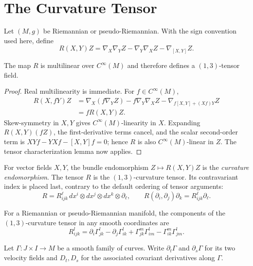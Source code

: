 \section{The Curvature Tensor}

Let $(M,g)$ be Riemannian or pseudo-Riemannian. With the sign convention used
here, define
\[
R(X,Y)Z
=\nabla_X\nabla_YZ-\nabla_Y\nabla_XZ-\nabla_{[X,Y]}Z.
\]

\begin{proposition}
\label{prop:curvature-multilinearity}
The map $R$ is multilinear over $C^\infty(M)$ and therefore defines a
$(1,3)$-tensor field.
\end{proposition}

\begin{proof}
\sketch Real multilinearity is immediate. For $f\in C^\infty(M)$,
\begin{align*}
R(X,fY)Z
&=\nabla_X(f\nabla_YZ)-f\nabla_Y\nabla_XZ
  -\nabla_{f[X,Y]+(Xf)Y}Z\\
&=fR(X,Y)Z.
\end{align*}
Skew-symmetry in $X,Y$ gives $C^\infty(M)$-linearity in $X$. Expanding
$R(X,Y)(fZ)$, the first-derivative terms cancel, and the scalar second-order
term is
$XYf-YXf-[X,Y]f=0$; hence $R$ is also $C^\infty(M)$-linear in $Z$.
The tensor characterization lemma now applies.
\end{proof}

For vector fields $X,Y$, the bundle endomorphism $Z\mapsto R(X,Y)Z$ is the
\emph{curvature endomorphism}. The tensor $R$ is the $(1,3)$-curvature tensor.
Its contravariant index is placed last, contrary to the default ordering of
tensor arguments:
\[
R=R_{ijk}^{\ell}\,dx^i\otimes dx^j\otimes dx^k\otimes\partial_\ell,
\qquad
R(\partial_i,\partial_j)\partial_k=R_{ijk}^{\ell}\partial_\ell.
\]

\begin{proposition}
\label{prop:curvature-tensor-components}
For a Riemannian or pseudo-Riemannian manifold, the components of the
$(1,3)$-curvature tensor in any smooth coordinates are
\begin{equation}
R_{ijk}^l
=\partial_i\Gamma_{jk}^l-\partial_j\Gamma_{ik}^l
+\Gamma_{jk}^m\Gamma_{im}^l-\Gamma_{ik}^m\Gamma_{jm}^l. \tag{7.4}
\end{equation}
\end{proposition}

Let $\Gamma\colon J\times I\to M$ be a smooth family of curves. Write
$\partial_t\Gamma$ and $\partial_s\Gamma$ for its two velocity fields and
$D_t,D_s$ for the associated covariant derivatives along $\Gamma$.

